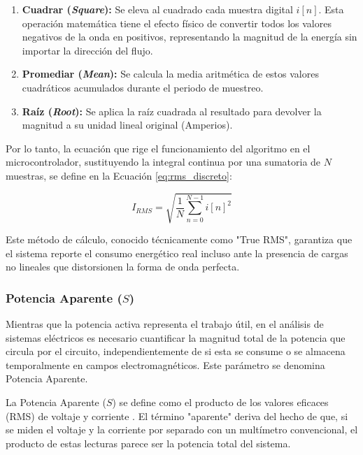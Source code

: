             \begin{enumerate}
                \item \textbf{Cuadrar (\textit{Square}):} Se eleva al cuadrado cada muestra digital $i[n]$. Esta operación matemática tiene el efecto físico de convertir todos los valores negativos de la onda en positivos, representando la magnitud de la energía sin importar la dirección del flujo.
                \item \textbf{Promediar (\textit{Mean}):} Se calcula la media aritmética de estos valores cuadráticos acumulados durante el periodo de muestreo.
                \item \textbf{Raíz (\textit{Root}):} Se aplica la raíz cuadrada al resultado para devolver la magnitud a su unidad lineal original (Amperios).
            \end{enumerate}

            Por lo tanto, la ecuación que rige el funcionamiento del algoritmo en el microcontrolador, sustituyendo la integral continua por una sumatoria de $N$ muestras, se define en la Ecuación \ref{eq:rms_discreto}:

            \begin{equation}
                I_{RMS} = \sqrt{\frac{1}{N} \sum_{n=0}^{N-1} i[n]^2}
                \label{eq:rms_discreto}
            \end{equation}

            Este método de cálculo, conocido técnicamente como "True RMS", garantiza que el sistema reporte el consumo energético real incluso ante la presencia de cargas no lineales que distorsionen la forma de onda perfecta.

        \subsubsection{Potencia Aparente ($S$)}

            Mientras que la potencia activa representa el trabajo útil, en el análisis de sistemas eléctricos es necesario cuantificar la magnitud total de la potencia que circula por el circuito, independientemente de si esta se consume o se almacena temporalmente en campos electromagnéticos. Este parámetro se denomina Potencia Aparente.

            La Potencia Aparente ($S$) se define como el producto de los valores eficaces (RMS) de voltaje y corriente \cite{hayt2012}. El término "aparente" deriva del hecho de que, si se miden el voltaje y la corriente por separado con un multímetro convencional, el producto de estas lecturas parece ser la potencia total del sistema.

